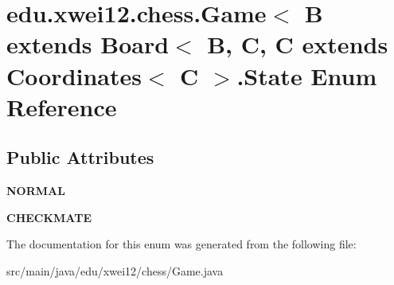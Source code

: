 \hypertarget{enumedu_1_1xwei12_1_1chess_1_1_game_1_1_state}{}\section{edu.\+xwei12.\+chess.\+Game$<$ B extends Board$<$ B, C, C extends Coordinates$<$ C $>$.State Enum Reference}
\label{enumedu_1_1xwei12_1_1chess_1_1_game_1_1_state}
\subsection*{Public Attributes}
\begin{DoxyCompactItemize}
\item 
{\bfseries N\+O\+R\+M\+AL}\hypertarget{enumedu_1_1xwei12_1_1chess_1_1_game_1_1_state_a6c56bbb3d917ac45c9420b5e3dace42d}{}\label{enumedu_1_1xwei12_1_1chess_1_1_game_1_1_state_a6c56bbb3d917ac45c9420b5e3dace42d}

\item 
{\bfseries C\+H\+E\+C\+K\+M\+A\+TE}\hypertarget{enumedu_1_1xwei12_1_1chess_1_1_game_1_1_state_abcbb442bcc94baa4d8b807e9dbb7f3eb}{}\label{enumedu_1_1xwei12_1_1chess_1_1_game_1_1_state_abcbb442bcc94baa4d8b807e9dbb7f3eb}

\end{DoxyCompactItemize}


The documentation for this enum was generated from the following file\+:\begin{DoxyCompactItemize}
\item 
src/main/java/edu/xwei12/chess/Game.\+java\end{DoxyCompactItemize}
